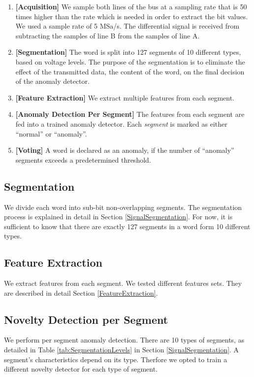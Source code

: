 \documentclass[conference]{IEEEtran}
\begin{document}
  \begin{enumerate}
    \item \textbf{[Acquisition]}
          We sample both lines of the bus at a sampling rate that is 50 times higher than the rate which is needed in order to extract the bit values. We used a sample rate of 5 MSa/s. The differential signal is received from subtracting the samples of line B from the samples of line A.
    \item \textbf{[Segmentation]}
          The word is split into 127 segments of 10 different types, based on voltage levels. The purpose of the segmentation is to eliminate the effect of the transmitted data, the content of the word, on the final decision of the anomaly detector.
    \item \textbf{[Feature Extraction]}
          We extract multiple features from each segment. 
    \item \textbf{[Anomaly Detection Per Segment]}
          The features from each segment are fed into a trained anomaly detector. Each \textit{segment} is marked as either ``normal'' or ``anomaly''.
    \item \textbf{[Voting]}
          A word is declared as an anomaly, if the number of ``anomaly'' segments exceeds a predetermined threshold.
  \end{enumerate}
  
\subsection{Segmentation}
  We divide each word into sub-bit non-overlapping segments. The segmentation process is explained in detail in Section \ref{SignalSegmentation}. For now, it is sufficient to know that there are exactly 127 segments in a word form 10 different types.

\subsection{Feature Extraction}
  We extract features from each segment. We tested different features sets. They are described in detail Section \ref{FeatureExtraction}.

\subsection{Novelty Detection per Segment}
  We perform per segment anomaly detection. There are 10 types of segments, as detailed in Table \ref{tab:SegmentationLevels} in Section \ref{SignalSegmentation}. A segment's characteristics depend on its type. Therfore we opted to train a different novelty detector for each type of segment.
  
\end{document}
